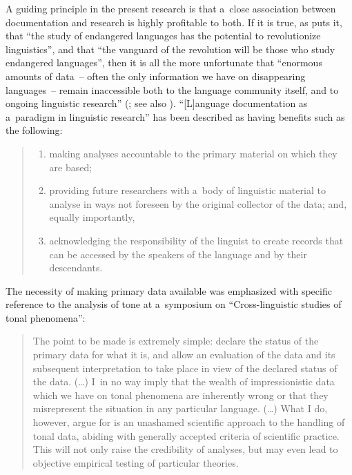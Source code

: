 A guiding principle in the present research is that a~close association between documentation and
research is highly profitable to both. If it is true, as \citet{Whalen2004} puts it,
that “the study of endangered languages has the potential to revolutionize linguistics”, and that
“the vanguard of the revolution will be those who study endangered languages”, then it is all the
more unfortunate that “enormous amounts of data~-- often the only information we have on
disappearing languages~-- remain inaccessible both to the language community itself, and to ongoing
linguistic research” (\citealt{thiebergeretal2006}; see also
\citealt{woodbury2003,woodbury2011}). “[L]anguage documentation as a~paradigm in linguistic
research” has been described as having benefits such as the following: 
\begin{quotation}
\begin{enumerate}[label=(\roman*)]
	\item  making analyses accountable to the primary material on which they are
based; 

	\item  providing future researchers with a~body of linguistic material to analyse
in ways not foreseen by the original collector of the data; and, equally importantly,

	\item  acknowledging the responsibility of the linguist to create records that can be
accessed by the speakers of the language and by their descendants. \citep[1]{thiebergeretal2016}
\end{enumerate}
\end{quotation}

The necessity of making primary data available was emphasized with specific reference to the analysis of tone at a~symposium on “Cross-linguistic studies of tonal phenomena”:
 
\begin{quotation}
The point to be made is extremely simple: declare the status of the primary data for what it is, and allow an evaluation of the data and its subsequent interpretation to take place in view of the declared status of the data. ({\dots}) I~in no way imply that the wealth of impressionistic data which we have on tonal phenomena are inherently wrong or that they misrepresent the situation in any particular language. ({\dots}) What I do, however, argue for is an unashamed scientific approach to the handling of tonal data, abiding with generally accepted criteria of scientific practice. This will not only raise the credibility of analyses, but may even lead to objective empirical testing of particular theories. \citep[366]{roux2001}
\end{quotation}

